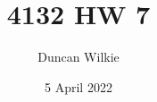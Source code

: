 \documentclass{article}
\title{4132 HW 7}
\author{Duncan Wilkie}
\date{5 April 2022}
\begin{document}
\maketitle

\section{}
\end{document}
